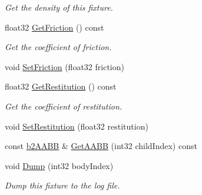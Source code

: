 \begin{DoxyCompactItemize}
\begin{DoxyCompactList}\small\item\em Get the density of this fixture. \end{DoxyCompactList}\item 
float32 \hyperlink{classb2_fixture_a31253b90b87f1fec7256bba92aeb4645}{Get\+Friction} () const \hypertarget{classb2_fixture_a31253b90b87f1fec7256bba92aeb4645}{}\label{classb2_fixture_a31253b90b87f1fec7256bba92aeb4645}

\begin{DoxyCompactList}\small\item\em Get the coefficient of friction. \end{DoxyCompactList}\item 
void \hyperlink{classb2_fixture_ad0cd91eef5858c8ef1d6b62cc2a34ea2}{Set\+Friction} (float32 friction)
\item 
float32 \hyperlink{classb2_fixture_a6ce4d949ffff6201a117f1e3833953f8}{Get\+Restitution} () const \hypertarget{classb2_fixture_a6ce4d949ffff6201a117f1e3833953f8}{}\label{classb2_fixture_a6ce4d949ffff6201a117f1e3833953f8}

\begin{DoxyCompactList}\small\item\em Get the coefficient of restitution. \end{DoxyCompactList}\item 
void \hyperlink{classb2_fixture_a19c507332e4f7bd04a05f00426f11ee4}{Set\+Restitution} (float32 restitution)
\item 
const \hyperlink{structb2_a_a_b_b}{b2\+A\+A\+BB} \& \hyperlink{classb2_fixture_abdc2a225110310a481a78cdb14000ca7}{Get\+A\+A\+BB} (int32 child\+Index) const 
\item 
void \hyperlink{classb2_fixture_a57485e73a2063060e320c7176676cd5e}{Dump} (int32 body\+Index)\hypertarget{classb2_fixture_a57485e73a2063060e320c7176676cd5e}{}\label{classb2_fixture_a57485e73a2063060e320c7176676cd5e}

\begin{DoxyCompactList}\small\item\em Dump this fixture to the log file. \end{DoxyCompactList}\end{DoxyCompactItemize}
